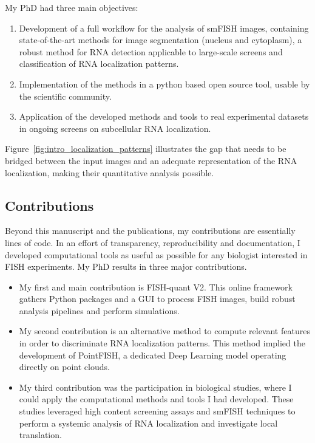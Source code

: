 My PhD had three main objectives:

\begin{enumerate}
	\setlength\itemsep{0.1em}
	\item Development of a full workflow for the analysis of \ac{smFISH} images, containing state-of-the-art methods for image segmentation (nucleus and cytoplasm), a robust method for \ac{RNA} detection applicable to large-scale screens and classification of \ac{RNA} localization patterns.
	\item Implementation of the methods in a python based open source tool, usable by the scientific community.
	\item Application of the developed methods and tools to real experimental datasets in ongoing screens on subcellular \ac{RNA} localization.
\end{enumerate}

Figure~\ref{fig:intro_localization_patterns} illustrates the gap that needs to be bridged between the input images and an adequate representation of the \ac{RNA} localization, making their quantitative analysis possible.

\subsection{Contributions}
\label{subsec:intro_contributions}

Beyond this manuscript and the publications, my contributions are essentially lines of code.
In an effort of transparency, reproducibility and documentation, I developed computational tools as useful as possible for any biologist interested in \ac{FISH} experiments.
My PhD results in three major contributions.

\begin{itemize}
	\setlength\itemsep{0.1em}
	\item My first and main contribution is FISH-quant V2.
	This online framework gathers Python packages and a \ac{GUI} to process \ac{FISH} images, build robust analysis pipelines and perform simulations.
	\item My second contribution is an alternative method to compute relevant features in order to discriminate \ac{RNA} localization patterns.
	This method implied the development of PointFISH, a dedicated Deep Learning model operating directly on point clouds.
	\item My third contribution was the participation in biological studies, where I could apply the computational methods and tools I had developed.
	These studies leveraged high content screening assays and \ac{smFISH} techniques to perform a systemic analysis of \ac{RNA} localization and investigate local translation.
\end{itemize}

